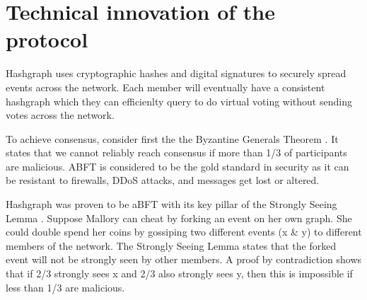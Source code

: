 \section{Technical innovation of the protocol}


Hashgraph uses cryptographic hashes and digital signatures to securely spread events across the network. Each member will eventually have a consistent hashgraph which they can efficienlty query to do virtual voting without sending votes across the network.

To achieve consensus, consider first the the Byzantine Generals Theorem \cite{shostak1982byzantine}. It states that we cannot reliably reach consensus if more than 1/3 of participants are malicious. ABFT is considered to be the gold standard in security as it can be resistant to firewalls, DDoS attacks, and messages get lost or altered.

Hashgraph was proven to be aBFT with its key pillar of the Strongly Seeing Lemma \cite{baird2016}. Suppose Mallory can cheat by forking an event on her own graph. She could double spend her coins by gossiping two different events (x \& y) to different members of the network. The Strongly Seeing Lemma states that the forked event will not be strongly seen by other members. A proof by contradiction shows that if 2/3 strongly sees x and 2/3 also strongly sees y, then this is impossible if less than 1/3 are malicious.


